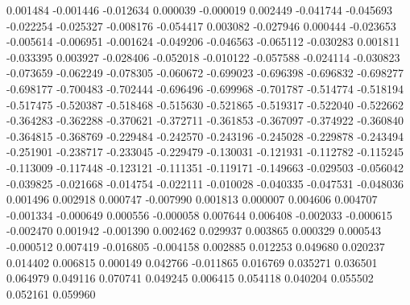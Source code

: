 0.001484
-0.001446
-0.012634
0.000039
-0.000019
0.002449
-0.041744
-0.045693
-0.022254
-0.025327
-0.008176
-0.054417
0.003082
-0.027946
0.000444
-0.023653
-0.005614
-0.006951
-0.001624
-0.049206
-0.046563
-0.065112
-0.030283
0.001811
-0.033395
0.003927
-0.028406
-0.052018
-0.010122
-0.057588
-0.024114
-0.030823
-0.073659
-0.062249
-0.078305
-0.060672
-0.699023
-0.696398
-0.696832
-0.698277
-0.698177
-0.700483
-0.702444
-0.696496
-0.699968
-0.701787
-0.514774
-0.518194
-0.517475
-0.520387
-0.518468
-0.515630
-0.521865
-0.519317
-0.522040
-0.522662
-0.364283
-0.362288
-0.370621
-0.372711
-0.361853
-0.367097
-0.374922
-0.360840
-0.364815
-0.368769
-0.229484
-0.242570
-0.243196
-0.245028
-0.229878
-0.243494
-0.251901
-0.238717
-0.233045
-0.229479
-0.130031
-0.121931
-0.112782
-0.115245
-0.113009
-0.117448
-0.123121
-0.111351
-0.119171
-0.149663
-0.029503
-0.056042
-0.039825
-0.021668
-0.014754
-0.022111
-0.010028
-0.040335
-0.047531
-0.048036
0.001496
0.002918
0.000747
-0.007990
0.001813
0.000007
0.004606
0.004707
-0.001334
-0.000649
0.000556
-0.000058
0.007644
0.006408
-0.002033
-0.000615
-0.002470
0.001942
-0.001390
0.002462
0.029937
0.003865
0.000329
0.000543
-0.000512
0.007419
-0.016805
-0.004158
0.002885
0.012253
0.049680
0.020237
0.014402
0.006815
0.000149
0.042766
-0.011865
0.016769
0.035271
0.036501
0.064979
0.049116
0.070741
0.049245
0.006415
0.054118
0.040204
0.055502
0.052161
0.059960
